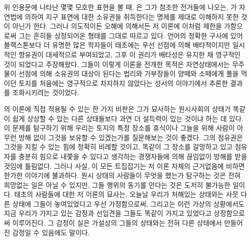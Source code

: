 위 인용문에 나타난 몇몇 모호한 표현을 볼 때,
은
그가 참조한 전거들에 나오는,
가 자연법에 의하여 지구 표면에 대한 소유권을 취득한다는
명제를 제대로 이해하지 못한 것이 아닌가 한다.
그러나
의도적이든 오해에 의해서든
저 이론에 이처럼 제한을 가함으로써
그는
흔히들 상정되어온 형태를 그대로 따르고 있다.
언어의 정확한 구사에 있어
블랙스톤보다 더
유명한 많은 학자들이
태초에는
우선
선점에 의해
배타적이지만 일시적인 향유권이 대세적으로
부여되었고,
그후 이 권리가 배타성은 유지한 채 영구적인 것이 되었다고
주장해왔다.
그들이 이렇게 이론을 전개한 목적은
자연상태에서는
무주물이
선점에 의해
소유권의 대상이 된다는 법리와
가부장들이
양떼와 소떼에게 풀을 먹이던 토지를
처음에는
영구적으로 차지하지 않았다는
성서의 이야기에서
추론한 결과를
조화시키려는 것이었다. %

의 이론에 직접 적용될 수 있는 한 가지 비판은
그가 묘사하는 원시사회의 상태가
똑같이 쉽게 상상할 수 있는 다른 상태들보다 과연 더 설득력이 있는 것이냐
하는 데 있다.
이 문제를 탐구하기 위해
우리는
토지의 특정 장소를 휴식이나 그늘을 위해
사람이 아무런 방해 없이 그것을 보유할 수 있겠는가를
질문해보는 것이 좋겠다.
그의 점유권은 그것을 지킬 수 있는 힘에 정확히 비례할 것이고,
똑같이 그 장소를 갈망하고 있고
점유자를
충분히
힘으로
내쫓을 수 있다고 생각하는
경쟁자들에 의해 끊임없이 방해를 받을 것임에 틀림없다.
그러나 사실,
이 모든 트집잡기는 저 이론 자체의 근거없음에 비하면 한가한 이야기에 불과하다.
원시 상태의 사람들이 무엇을 했는가 탐구하는 것은
전혀 희망없는 일은 아닐 수 있지만,
그들 행위의 동기를 안다는 것은 도저히 불가능한 일이다.
태초의 사람들에 대한 저 이론의 묘사는,
오늘날 우리가 처해있는 상태와는 사뭇 다른 상태에
그들이 놓여있었다고 우선 가정함으로써,
그리고는
이런 가상의 상황에서도
지금 우리가 가지고 있는 감정과 선입견을
그들도
똑같이 가지고 있었다고 상정함으로써 이루어진다.
그 감정이 실은 가설상의 그들의 상태와는 전혀 다른 상태에서
만들어진 감정일 수 있음에도 말이다.


